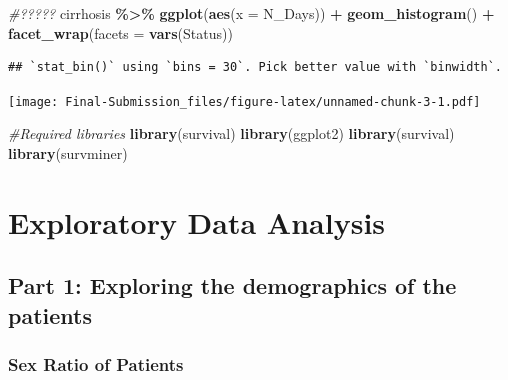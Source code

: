 \documentclass[
]{article}
\newenvironment{Shaded}{\begin{snugshade}}{\end{snugshade}}
\newcommand{\AttributeTok}[1]{\textcolor[rgb]{0.13,0.29,0.53}{#1}}
\newcommand{\CommentTok}[1]{\textcolor[rgb]{0.56,0.35,0.01}{\textit{#1}}}
\newcommand{\FunctionTok}[1]{\textcolor[rgb]{0.13,0.29,0.53}{\textbf{#1}}}
\newcommand{\NormalTok}[1]{#1}
\newcommand{\SpecialCharTok}[1]{\textcolor[rgb]{0.81,0.36,0.00}{\textbf{#1}}}
\begin{document}
\begin{Shaded}
\begin{Highlighting}[]
\CommentTok{\#?????}
\NormalTok{cirrhosis }\SpecialCharTok{\%\textgreater{}\%} 
  \FunctionTok{ggplot}\NormalTok{(}\FunctionTok{aes}\NormalTok{(}\AttributeTok{x =}\NormalTok{ N\_Days)) }\SpecialCharTok{+} \FunctionTok{geom\_histogram}\NormalTok{() }\SpecialCharTok{+}
  \FunctionTok{facet\_wrap}\NormalTok{(}\AttributeTok{facets =} \FunctionTok{vars}\NormalTok{(Status))}
\end{Highlighting}
\end{Shaded}

\begin{verbatim}
## `stat_bin()` using `bins = 30`. Pick better value with `binwidth`.
\end{verbatim}

\texttt{[image: Final-Submission\_files/figure-latex/unnamed-chunk-3-1.pdf]}

\begin{Shaded}
\begin{Highlighting}[]
\CommentTok{\#Required libraries}
\FunctionTok{library}\NormalTok{(survival)}
\FunctionTok{library}\NormalTok{(ggplot2)}
\FunctionTok{library}\NormalTok{(survival)}
\FunctionTok{library}\NormalTok{(survminer)}
\end{Highlighting}
\end{Shaded}

\hypertarget{exploratory-data-analysis}{%
\section{Exploratory Data Analysis}\label{exploratory-data-analysis}}

\hypertarget{part-1-exploring-the-demographics-of-the-patients}{%
\subsection{Part 1: Exploring the demographics of the
patients}\label{part-1-exploring-the-demographics-of-the-patients}}

\hypertarget{sex-ratio-of-patients}{%
\subsubsection{Sex Ratio of Patients}\label{sex-ratio-of-patients}}
\end{document}
